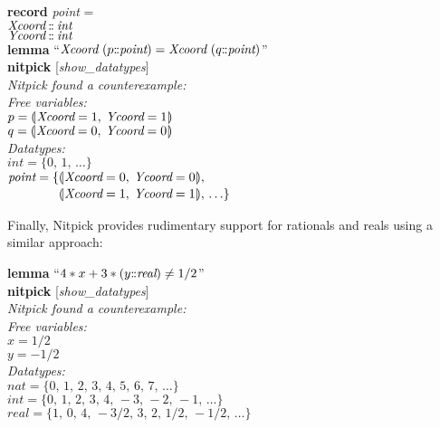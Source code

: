 \documentclass[a4paper,12pt]{article}
\def\Colon{\mathord{:\mkern-1.5mu:}}
\def\lparr{\mathopen{(\mkern-4mu\mid}}
\def\rparr{\mathclose{\mid\mkern-4mu)}}
\def\unr{\ldots}
\begin{document}
\prew
\textbf{record} \textit{point} = \\
\hbox{}\quad $\textit{Xcoord} \mathbin{\Colon} \textit{int}$ \\
\hbox{}\quad $\textit{Ycoord} \mathbin{\Colon} \textit{int}$ \\[2\smallskipamount]
\textbf{lemma} ``$\textit{Xcoord}~(p\Colon\textit{point}) = \textit{Xcoord}~(q\Colon\textit{point})$'' \\
\textbf{nitpick} [\textit{show\_datatypes}] \\[2\smallskipamount]
\slshape Nitpick found a counterexample: \\[2\smallskipamount]
\hbox{}\qquad Free variables: \nopagebreak \\
\hbox{}\qquad\qquad $p = \lparr\textit{Xcoord} = 1,\> \textit{Ycoord} = 1\rparr$ \\
\hbox{}\qquad\qquad $q = \lparr\textit{Xcoord} = 0,\> \textit{Ycoord} = 0\rparr$ \\
\hbox{}\qquad Datatypes: \\
\hbox{}\qquad\qquad $\textit{int} = \{0,\, 1,\, \unr\}$ \\
\hbox{}\qquad\qquad $\textit{point} = \{\!\begin{aligned}[t]
& \lparr\textit{Xcoord} = 0,\> \textit{Ycoord} = 0\rparr, \\[-2pt] %
& \lparr\textit{Xcoord} = 1,\> \textit{Ycoord} = 1\rparr,\, \unr\}\end{aligned}$
\postw

Finally, Nitpick provides rudimentary support for rationals and reals using a
similar approach:

\prew
\textbf{lemma} ``$4 * x + 3 * (y\Colon\textit{real}) \not= 1/2$'' \\
\textbf{nitpick} [\textit{show\_datatypes}] \\[2\smallskipamount]
\slshape Nitpick found a counterexample: \\[2\smallskipamount]
\hbox{}\qquad Free variables: \nopagebreak \\
\hbox{}\qquad\qquad $x = 1/2$ \\
\hbox{}\qquad\qquad $y = -1/2$ \\
\hbox{}\qquad Datatypes: \\
\hbox{}\qquad\qquad $\textit{nat} = \{0,\, 1,\, 2,\, 3,\, 4,\, 5,\, 6,\, 7,\, \unr\}$ \\
\hbox{}\qquad\qquad $\textit{int} = \{0,\, 1,\, 2,\, 3,\, 4,\, -3,\, -2,\, -1,\, \unr\}$ \\
\hbox{}\qquad\qquad $\textit{real} = \{1,\, 0,\, 4,\, -3/2,\, 3,\, 2,\, 1/2,\, -1/2,\, \unr\}$
\postw
\end{document}
